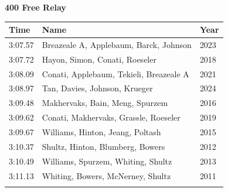 \vspace{1.2em}
\noindent\begin{minipage}[t]{0.98\textwidth}
\centering
\textbf{\textcolor{teamprimary}{400 Free Relay}}\par
\vspace{0.5em}
\centering
\small
\renewcommand{\arraystretch}{1.0}
\setlength{\tabcolsep}{4pt}
\begin{tabular}{@{}p{4.5cm}p{8.5cm}p{2.5cm}@{}}
\toprule
\textbf{Time} & \textbf{Name} & \textbf{Year} \\
\midrule
3:07.57 & Breazeale A, Applebaum, Barck, Johnson & 2023 \\
3:07.72 & Hayon, Simon, Conati, Roeseler & 2018 \\
3:08.09 & Conati, Applebaum, Tekieli, Breazeale A & 2021 \\
3:08.97 & Tan, Davies, Johnson, Krueger & 2024 \\
3:09.48 & Makhervaks, Bain, Meng, Spurzem & 2016 \\
3:09.62 & Conati, Makhervaks, Grassle, Roeseler & 2019 \\
3:09.67 & Williams, Hinton, Jeang, Poltash & 2015 \\
3:10.37 & Shultz, Hinton, Blumberg, Bowers & 2012 \\
3:10.49 & Williams, Spurzem, Whiting, Shultz & 2013 \\
3:11.13 & Whiting, Bowers, McNerney, Shultz & 2011 \\
\bottomrule
\vspace{0.5em}
\end{tabular}
\end{minipage}
\vspace{1.2em}

